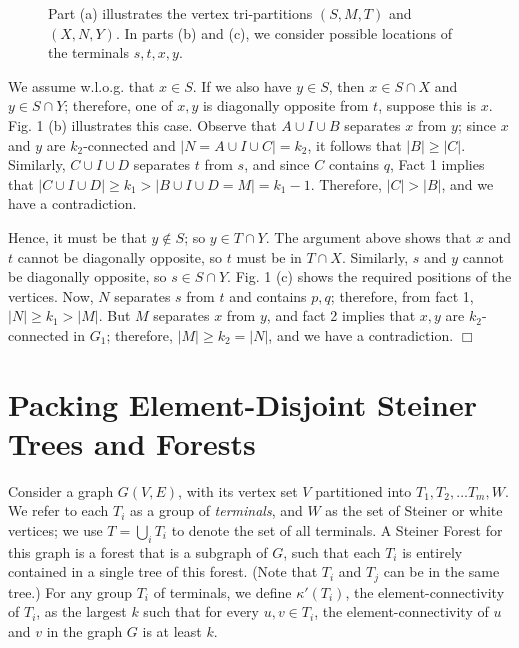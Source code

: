 \documentclass[11pt]{article}
\newcommand{\elconn}{\kappa'}
\renewenvironment{proof}{\vspace{-0.1in}\noindent{\bf Proof:}}{\hspace*{\fill}$\Box$\par}
\begin{document}
\begin{proof}
\begin{figure}[h]
\begin{center}
    \end{center}
    \vspace{-0.35in}
    \caption{Part (a) illustrates the vertex tri-partitions $(S,M,T)$
      and $(X,N,Y)$. \newline In parts (b) and (c), we consider possible
      locations of the terminals $s,t,x,y$.}
  \end{figure}

  We assume w.l.o.g. that $x \in S$. If we also have $y \in S$, then
  $x \in S \cap X$ and $y \in S \cap Y$; therefore, one of $x,y$ is
  diagonally opposite from $t$, suppose this is $x$. Fig. 1 (b)
  illustrates this case. Observe that $A \cup I \cup B$ separates $x$
  from $y$; since $x$ and $y$ are $k_2$-connected and $|N = A \cup I
  \cup C| = k_2$, it follows that $|B| \ge |C|$. Similarly, $C \cup I
  \cup D$ separates $t$ from $s$, and since $C$ contains $q$, Fact 1
  implies that $|C \cup I \cup D| \ge k_1 > |B \cup I \cup D = M| =
  k_1 - 1$. Therefore, $|C| > |B|$, and we have a contradiction.

  Hence, it must be that $y \notin S$; so $y \in T \cap Y$. The
  argument above shows that $x$ and $t$ cannot be diagonally opposite,
  so $t$ must be in $T \cap X$. Similarly, $s$ and $y$ cannot be
  diagonally opposite, so $s \in S \cap Y$. Fig. 1 (c) shows the
  required positions of the vertices. Now, $N$ separates $s$ from $t$
  and contains $p,q$; therefore, from fact 1, $|N| \ge k_1 > |M|$. But
  $M$ separates $x$ from $y$, and fact 2 implies that $x,y$ are
  $k_2$-connected in $G_1$; therefore, $|M| \ge k_2 = |N|$, and we
  have a contradiction.
\end{proof}

\section{Packing Element-Disjoint Steiner Trees and Forests}
\label{sec:packingForests}

Consider a graph $G(V,E)$, with its vertex set $V$ partitioned into
$T_1, T_2, \ldots T_m, W$. We refer to each $T_i$ as a group of
\emph{terminals}, and $W$ as the set of Steiner or white vertices; we
use $T = \bigcup_i T_i$ to denote the set of all terminals. A Steiner
Forest for this graph is a forest that is a subgraph of $G$, such that
each $T_i$ is entirely contained in a single tree of this
forest. (Note that $T_i$ and $T_j$ can be in the same tree.)  For
any group $T_i$ of terminals, we define $\elconn(T_i)$, the
element-connectivity of $T_i$, as the largest $k$ such that for every
$u,v \in T_i$, the element-connectivity of $u$ and $v$ in the graph
$G$ is at least $k$.
\end{document}

